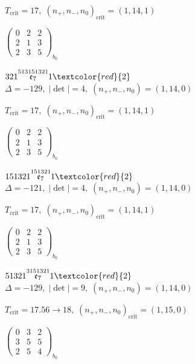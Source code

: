 \documentclass[10pt]{article}
\begin{document}
\hspace{1em}$T_{\text{crit}}=17,\; (n_+,n_-,n_0)_{\text{crit}}=(1,14,1)$

\hspace{2em}$\left(\begin{smallmatrix}0 & 2 & 2 \\ 2 & 1 & 3 \\ 2 & 3 & 5\end{smallmatrix}\right)_{\!b_0}$

\smallskip

$321\overset{513151321}{\mathfrak{e}_7}1\textcolor{red}{2}$ \quad $\Delta=-129,\; |\det|=4,\; (n_+,n_-,n_0)=(1,14,0)$

\hspace{1em}$T_{\text{crit}}=17,\; (n_+,n_-,n_0)_{\text{crit}}=(1,14,1)$

\hspace{2em}$\left(\begin{smallmatrix}0 & 2 & 2 \\ 2 & 1 & 3 \\ 2 & 3 & 5\end{smallmatrix}\right)_{\!b_0}$

\smallskip

$151321\overset{151321}{\mathfrak{e}_7}1\textcolor{red}{2}$ \quad $\Delta=-121,\; |\det|=4,\; (n_+,n_-,n_0)=(1,14,0)$

\hspace{1em}$T_{\text{crit}}=17,\; (n_+,n_-,n_0)_{\text{crit}}=(1,14,1)$

\hspace{2em}$\left(\begin{smallmatrix}0 & 2 & 2 \\ 2 & 1 & 3 \\ 2 & 3 & 5\end{smallmatrix}\right)_{\!b_0}$

\smallskip

$51321\overset{3151321}{\mathfrak{e}_7}1\textcolor{red}{2}$ \quad $\Delta=-129,\; |\det|=9,\; (n_+,n_-,n_0)=(1,14,0)$

\hspace{1em}$T_{\text{crit}}=17.56 \to 18,\; (n_+,n_-,n_0)_{\text{crit}}=(1,15,0)$

\hspace{2em}$\left(\begin{smallmatrix}0 & 3 & 2 \\ 3 & 5 & 5 \\ 2 & 5 & 4\end{smallmatrix}\right)_{\!b_0}$
\end{document}
